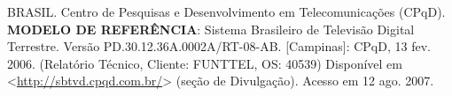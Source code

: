 \begin{thebibliography}{99}

    BRASIL. {C}entro de {P}esquisas e {D}esenvolvimento em {T}elecomunicações ({CPqD}).
    \textbf{MODELO DE REFERÊNCIA}: Sistema Brasileiro de Televisão Digital Terrestre.
    Versão PD.30.12.36A.0002A/RT-08-AB.
    [Campinas]: CPqD, 13 fev. 2006.
    (Relatório Técnico, Cliente: FUNTTEL, OS: 40539)
    Disponível em <\url{http://sbtvd.cpqd.com.br/}> (seção de Divulgação).
    Acesso em 12 ago. 2007.

  

\end{thebibliography}